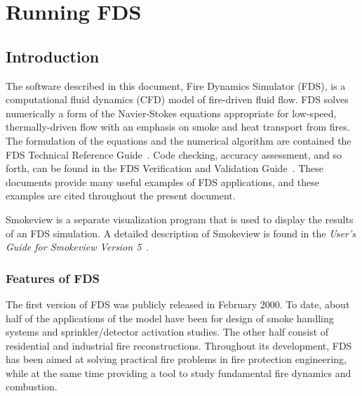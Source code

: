 \documentclass[11pt]{book}
\begin{document}
\part{Running FDS}


\chapter{Introduction}

The software described in this document, Fire Dynamics Simulator (FDS), is a computational
fluid dynamics (CFD) model of fire-driven fluid flow. FDS solves numerically a form of the
Navier-Stokes equations appropriate for low-speed, thermally-driven flow
with an emphasis on smoke and heat transport from fires.
The formulation of the equations and the numerical algorithm are contained the FDS Technical Reference Guide~\cite{FDS_Tech_Guide_5}.
Code checking, accuracy assessment, and so forth, can be found in the FDS Verification and Validation Guide~\cite{FDS_VV_Guide_5}.
These documents provide many useful examples of FDS applications, and these examples are cited
throughout the present document.

Smokeview is a separate visualization program that is used to display the
results of an FDS simulation.
A detailed description of Smokeview is found in the
{\em User's Guide for Smokeview Version 5}~\cite{Smokeview_Users_Guide_5}.


\section{Features of FDS}

The first version of FDS was publicly released in February 2000.
To date, about half of the applications of the model have been for design of smoke
handling systems and sprinkler/detector activation studies. The other half consist of
residential and industrial fire reconstructions. Throughout its development, FDS has
been aimed at solving practical fire problems in fire protection engineering, while
at the same time providing a tool to study fundamental fire dynamics and combustion.
\end{document}
